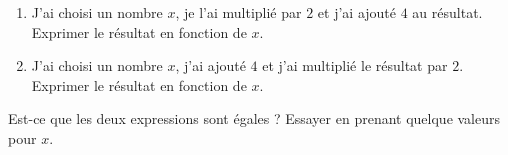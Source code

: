 
\begin{exercice}\label{exosmath-0934}

    \begin{enumerate}
        \item
            J'ai choisi un nombre \( x\), je l'ai multiplié par \( 2\) et j'ai ajouté $4$ au résultat. Exprimer le résultat en fonction de \( x\).
        \item
            J'ai choisi un nombre \( x\), j'ai ajouté \( 4\) et j'ai multiplié le résultat par \( 2\). Exprimer le résultat en fonction de \( x\).
    \end{enumerate}
    Est-ce que les deux expressions sont égales ? Essayer en prenant quelque valeurs pour \( x\).

\end{exercice}

